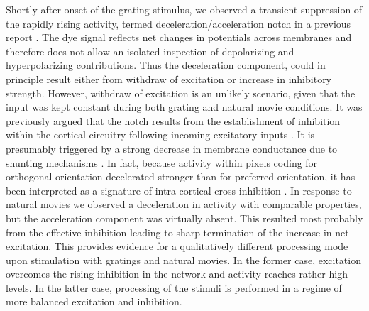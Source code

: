Shortly after onset of the grating stimulus, we observed a transient
suppression of the rapidly rising activity, termed
deceleration/acceleration notch in a previous report \citep{sharon2002a}.
The dye signal reflects net changes in potentials across membranes and
therefore does not allow an isolated inspection of depolarizing and
hyperpolarizing contributions. Thus the deceleration component, could in
principle result either from withdraw of excitation or increase in
inhibitory strength. However, withdraw of excitation is an unlikely
scenario, given that the input was kept constant during both grating and
natural movie conditions. It was previously argued that the notch results
from the establishment of inhibition within the cortical circuitry
following incoming excitatory inputs \citep{sharon2002a}. It is presumably
triggered by a strong decrease in membrane conductance due to shunting
mechanisms \citep{borg-graham1998a, hirsch1998a, sharon2002a}. In fact,
because activity within pixels coding for orthogonal orientation
decelerated stronger than for preferred orientation, it has been
interpreted as a signature of intra-cortical cross-inhibition
\citep{bonds1989a, ben-yishai1995a, somers1995a, mcLaughlin2000a,
shapley2003a}. In response to natural movies we observed a deceleration in
activity with comparable properties, but the acceleration component was
virtually absent. This resulted most probably from the effective inhibition
leading to sharp termination of the increase in net-excitation. This
provides evidence for a qualitatively different processing mode upon
stimulation with gratings and natural movies. In the former case,
excitation overcomes the rising inhibition in the network and activity
reaches rather high levels. In the latter case, processing of the stimuli
is performed in a regime of more balanced excitation and inhibition. 

